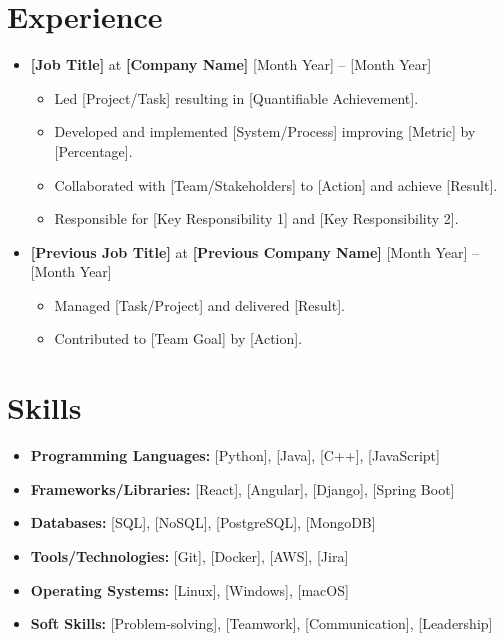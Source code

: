 \documentclass[letterpaper,10pt]{article}
\begin{document}
\section*{Experience}
\vspace{5pt}
\color{textgray}
\begin{itemize}
    \item \textbf{[Job Title]} at \textbf{[Company Name]} \hfill [Month Year] -- [Month Year]
          \begin{itemize}[label=$\bullet$]
              \item Led [Project/Task] resulting in [Quantifiable Achievement].
              \item Developed and implemented [System/Process] improving [Metric] by [Percentage].
              \item Collaborated with [Team/Stakeholders] to [Action] and achieve [Result].
              \item Responsible for [Key Responsibility 1] and [Key Responsibility 2].
          \end{itemize}
    \item \textbf{[Previous Job Title]} at \textbf{[Previous Company Name]} \hfill [Month Year] -- [Month Year]
          \begin{itemize}[label=$\bullet$]
              \item Managed [Task/Project] and delivered [Result].
              \item Contributed to [Team Goal] by [Action].
          \end{itemize}
\end{itemize}

\section*{Skills}
\vspace{5pt}
\color{textgray}
\begin{itemize}
    \item \textbf{Programming Languages:} [Python], [Java], [C++], [JavaScript]
    \item \textbf{Frameworks/Libraries:} [React], [Angular], [Django], [Spring Boot]
    \item \textbf{Databases:} [SQL], [NoSQL], [PostgreSQL], [MongoDB]
    \item \textbf{Tools/Technologies:} [Git], [Docker], [AWS], [Jira]
    \item \textbf{Operating Systems:} [Linux], [Windows], [macOS]
    \item \textbf{Soft Skills:} [Problem-solving], [Teamwork], [Communication], [Leadership]
\end{itemize}
\end{document}
